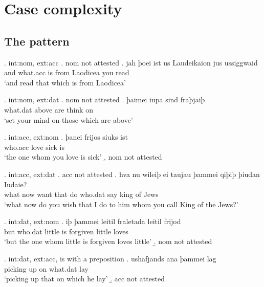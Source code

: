 
\chapter{Case complexity}

\section{The pattern}

\ex. \ac{int}:\ac{nom}, \ac{ext}:\ac{acc}
\a. \ac{nom} not attested
\bg. jah þoei ist us Laudeikaion jus ussiggwaid\\
 and what.\ac{acc} is\scsub{[nom]} from Laodicea you read\scsub{[acc]}\\
 `and read that which is from Laodicea' 

\ex. \ac{int}:\ac{nom}, \ac{ext}:\ac{dat}
\a. \ac{nom} not attested
\bg. þaimei iupa sind fraþjaiþ\\
 what.\ac{dat} above are\scsub{[nom]} {think on}\scsub{[dat]}\\
 `set your mind on those which are above' 

\ex. \ac{int}:\ac{acc}, \ac{ext}:\ac{nom}
\ag. þanei frijos siuks ist\\
 who.\ac{acc} love\scsub{[acc]} sick is\scsub{[nom]}\\
 `the one whom you love is sick' 
\b. \ac{nom} not attested

\ex. \ac{int}:\ac{acc}, \ac{ext}:\ac{dat}
\a. \ac{acc} not attested
\bg. hva nu wileiþ ei taujau þammei qiþiþ þiudan Iudaie?\\
 what now want that do\scsub{[dat]} who.\ac{dat} say\scsub{[acc]} king {of Jews}\\
 `what now do you wish that I do to him whom you call King of the Jews?' 

\ex. \ac{int}:\ac{dat}, \ac{ext}:\ac{nom}
\ag. iþ þammei leitil fraletada leitil frijod\\
 but who.\ac{dat} little {is forgiven\scsub{[dat]}} little loves\scsub{[nom]}\\
 `but the one whom little is forgiven loves little' 
\b. \ac{nom} not attested

\ex. \ac{int}:\ac{dat}, \ac{ext}:\ac{acc}, is with a preposition
\ag. ushafjands ana þammei lag\\
 {picking up}\scsub{[acc]}\scsub{[dat]} on what.\ac{dat} lay\\
 `picking up that on which he lay' 
\b. \ac{acc} not attested

